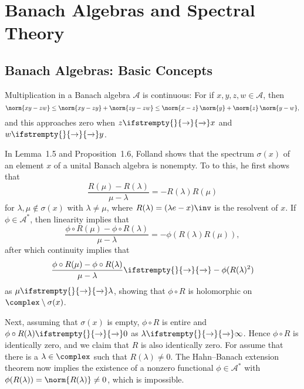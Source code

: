 \documentclass[article, a4paper, 11pt, oneside]{memoir}
\title{\doctitle}
\author{\docauthor}
\numberwithin{equation}{chapter}
\newcommand{\calA}{\mathcal{A}}
\renewcommand\to[1][]{%
    \ifstrempty{#1}{%
        \rightarrow
    }{%
        \xrightarrow[#1]{}
    }%
}
\begin{document}
\maketitle

\chapter{Banach Algebras and Spectral Theory}

\section{Banach Algebras: Basic Concepts}

\begin{remark}
    Multiplication in a Banach algebra $\calA$ is continuous: For if $x,y,z,w \in \calA$, then
    \begin{equation*}
        \norm{xy - zw}
            \leq \norm{xy - zy} + \norm{zy - zw}
            \leq \norm{x - z} \, \norm{y} + \norm{z} \, \norm{y - w},
    \end{equation*}
    and this approaches zero when $z \to x$ and $w \to y$.
\end{remark}

\begin{remark}
    In Lemma~1.5 and Proposition~1.6, Folland shows that the spectrum $\sigma(x)$ of an element $x$ of a unital Banach algebra is nonempty. To to this, he first shows that
    \begin{equation*}
        \frac{R(\mu) - R(\lambda)}{\mu - \lambda}
            = - R(\lambda) R(\mu)
    \end{equation*}
    for $\lambda, \mu \not\in \sigma(x)$ with $\lambda \neq \mu$, where $R(\lambda) = (\lambda e - x)\inv$ is the resolvent of $x$. If $\phi \in \calA^*$, then linearity implies that
    \begin{equation*}
        \frac{\phi \circ R(\mu) - \phi \circ R(\lambda)}{\mu - \lambda}
            = - \phi(R(\lambda) R(\mu)),
    \end{equation*}
    after which continuity implies that
    \begin{equation*}
        \frac{\phi \circ R(\mu) - \phi \circ R(\lambda)}{\mu - \lambda}
            \to - \phi(R(\lambda)^2)
    \end{equation*}
    as $\mu \to \lambda$, showing that $\phi \circ R$ is holomorphic on $\complex \setminus \sigma(x)$.

    Next, assuming that $\sigma(x)$ is empty, $\phi \circ R$ is entire and $\phi \circ R(\lambda) \to 0$ as $\lambda \to \infty$. Hence $\phi \circ R$ is identically zero, and we claim that $R$ is also identically zero. For assume that there is a $\lambda \in \complex$ such that $R(\lambda) \neq 0$. The Hahn--Banach extension theorem now implies the existence of a nonzero functional $\phi \in \calA^*$ with $\phi(R(\lambda)) = \norm{R(\lambda)} \neq 0$, which is impossible.
\end{remark}
\end{document}
